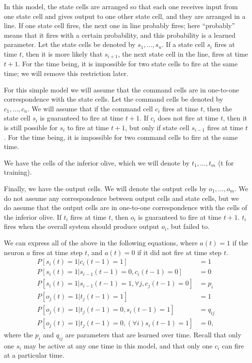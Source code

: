 \documentclass{article}
\theoremstyle{definition}
\begin{document}
In this model, the state cells are arranged so that each one receives
input from one state cell and gives output to one other state cell,
and they are arranged in a line. If one state cell fires, the next one
in line probably fires; here ``probably'' means that it fires with a
certain probability, and this probability is a learned parameter. Let
the state cells be denoted by $s_1, \dots, s_n$. If a state cell $s_i$
fires at time $t$, then it is more likely that $s_{i+1}$, the next
state cell in the line, fires at time $t+1$. For the time being, it is
impossible for two state cells to fire at the same time; we will
remove this restriction later.

For this simple model we will assume that the command cells are in
one-to-one correspondence with the state cells. Let the command cells
be denoted by $c_1, \dots, c_n$. We will assume that if the command
cell $c_i$ fires at time $t$, then the state cell $s_i$ is guaranteed
to fire at time $t+1$. If $c_i$ does not fire at time $t$, then it is
still possible for $s_i$ to fire at time $t+1$, but only if state cell
$s_{i-1}$ fires at time $t$. For the time being, it is impossible for
two command cells to fire at the same time.

We have the cells of the inferior olive, which we will denote by $t_1,
\dots, t_m$ (t for training).

Finally, we have the output cells. We will denote the output cells by
$o_1, \dots, o_m$. We do not assume any correspondence between output
cells and state cells, but we do assume that the output cells are in
one-to-one correspondence with the cells of the inferior olive. If
$t_i$ fires at time $t$, then $o_i$ is guaranteed to fire at time
$t+1$. $t_i$ fires when the overall system should produce output
$o_i$, but failed to.

We can express all of the above in the following equations, where
$a(t)=1$ if the neuron $a$ fires at time step $t$, and $a(t)=0$ if it
did not fire at time step $t$.
\begin{align*}
P \left[ s_i(t)=1 | c_i(t-1)=1 \right] &= 1 \\
P \left[ s_i(t)=1 | s_{i-1}(t-1)=0, c_i(t-1)=0 \right] &= 0\\
P \left[ s_i(t)=1 | s_{i-1}(t-1)=1, \forall j, c_j(t-1)=0 \right] &= p_i\\
P \left[ o_j(t)=1 | t_j(t-1)=1 \right] &= 1 \\
P \left[ o_j(t)=1 | t_j(t-1)=0, s_i(t-1)=1 \right] &= q_{ij} \\
P \left[ o_j(t)=1 | t_j(t-1)=0, (\forall i) s_i(t-1)=1 \right] &= 0,
\end{align*}
where the $p_i$ and $q_{ij}$ are parameters that are learned over
time. Recall that only one $s_i$ may be active at any one time in this
model, and that only one $c_i$ can fire at a particular time.
\end{document}

